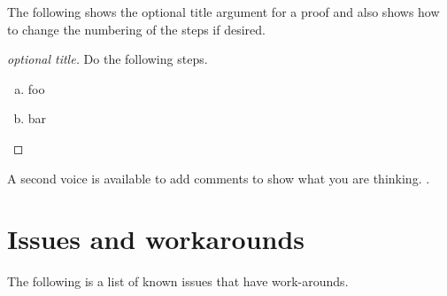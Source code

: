 \documentclass[solutionsatend,twocolumnsolutions]{ouunit}
\begin{document}
The following shows the optional title argument for a proof and also shows how to change the numbering of the steps if desired.
\begin{proof}[optional title]\strut

Do the following steps.
\begin{enumerate}[(a)]
\item foo 
\item bar
\end{enumerate}
\end{proof}

A second voice is available to add comments to show what you are thinking. .

\section{Issues and workarounds}

The following is a list of known issues that have work-arounds.
\end{document}
